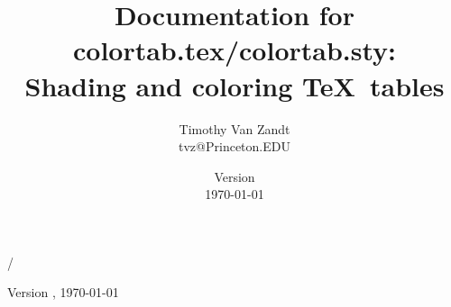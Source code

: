 \def\FileVersion{0.9}
\def\FileDate{1997/03/28}

\def\paperwidth{8.5in}
\def\paperheight{11in}


\makeatletter



\ifx\FileVersion\fileversion\else
  \@ehd
\fi


\def\expanddate#1/#2/#3/{\year=19#1 \month=#2 \day=#3}
\begingroup
  \expandafter\expanddate\filedate/
  \xdef\thefiledate{\today}
\endgroup

\title{Documentation for colortab.tex/colortab.sty:\\[5pt]
  Shading and coloring \TeX\ tables}
\author{Timothy Van Zandt\\ tvz@Princeton.EDU}
\date{Version \fileversion\\ \thefiledate}

\def\@maketitle{%
 \begin{center}
   {\Large\bf \@title \par}
   \vskip 1.2em {\lineskip .5em
   \begin{tabular}[t]{c}\@author\end{tabular}\par}
   \vskip .8em {\@date}%
  \end{center}
  \par
  \vskip .5em}


\pagestyle{myheadings}
\if@twoside
    {Version \fileversion, \thefiledate}%
\else
\fi


